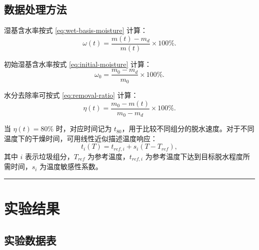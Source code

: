 \documentclass[UTF8,openany,zihao=-4,oneside]{ctexbook}
\newcommand{\manualdivider}{\par\vspace{0.6em}\noindent\textcolor{FGLine}{\rule{\linewidth}{0.7pt}}\vspace{0.6em}\par}
\begin{document}
\section{数据处理方法}

湿基含水率按式 \eqref{eq:wet-basis-moisture} 计算：
\begin{equation}
\omega(t)=\frac{m(t)-m_d}{m(t)}\times 100\% .
\label{eq:wet-basis-moisture}
\end{equation}

初始湿基含水率按式 \eqref{eq:initial-moisture} 计算：
\begin{equation}
\omega_0=\frac{m_0-m_d}{m_0}\times 100\% .
\label{eq:initial-moisture}
\end{equation}

水分去除率可按式 \eqref{eq:removal-ratio} 计算：
\begin{equation}
\eta(t)=\frac{m_0-m(t)}{m_0-m_d}\times 100\% .
\label{eq:removal-ratio}
\end{equation}

当 $\eta(t)=80\%$ 时，对应时间记为 $t_{80}$，用于比较不同组分的脱水速度。对于不同温度下的干燥时间，可用线性近似描述温度响应：
\begin{equation}
 t_i(T)=t_{ref,i}+s_i\left(T-T_{ref}\right),
\label{eq:temperature-sensitivity}
\end{equation}
其中 $i$ 表示垃圾组分，$T_{ref}$ 为参考温度，$t_{ref,i}$ 为参考温度下达到目标脱水程度所需时间，$s_i$ 为温度敏感性系数。

\manualdivider

\chapter{实验结果}

\section{实验数据表}
\end{document}
